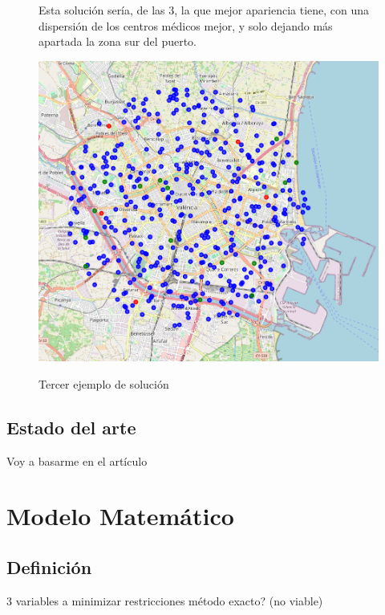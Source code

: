 \documentclass[12pt,a4paper]{book}
\begin{document}
\begin{figure}[htbp]
    \centering
    \begin{minipage}[c]{0.45\textwidth}
        Esta solución sería, de las 3, la que mejor apariencia tiene, con una dispersión de los centros médicos mejor, y solo dejando más apartada la zona sur del puerto.
    \end{minipage}
    \hfill
    \begin{minipage}[c]{0.45\textwidth}
        \includegraphics[width=\textwidth]{images/solucion_ejemplo_3.png}
        \label{fig:ejemplo_3}
    \end{minipage}
    \caption{Tercer ejemplo de solución}
\end{figure}

\newpage

\section{Estado del arte}

Voy a basarme en el artículo \cite{k-Balanced}



\chapter{Modelo Matemático}


\section{Definición}
3 variables a minimizar
restricciones
método exacto? (no viable)
\end{document}

